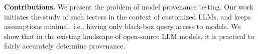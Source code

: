 %
%
%

%


\vspace{10pt}
\noindent
\textbf{Contributions.} We present the problem of model provenance testing. Our work initiates the study of such testers in the context of customized LLMs, and keeps assumptions minimal, i.e., having only black-box query access to models. We show that in the existing landscape of open-source LLM models, it is practical to fairly accurately determine provenance.

%